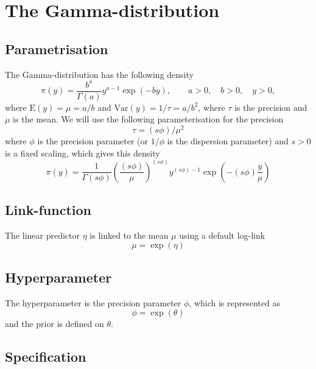\documentclass[a4paper,11pt]{article}
\begin{document}
\section*{The Gamma-distribution}

\subsection*{Parametrisation}

The Gamma-distribution has the following density
\begin{displaymath}
    \pi(y) = \frac{b^{a}}{\Gamma(a)} y^{a-1} \exp(-by), \qquad a>0,
    \quad b>0, \quad y >0,
\end{displaymath}
where $\text{E}(y) = \mu = a/b$ and $\text{Var}(y) = 1/\tau = a/b^{2}$,
where $\tau$ is the precision and $\mu$ is the mean. We will use the
following parameterisation for the precision
\begin{displaymath}
    \tau = (s\phi) / \mu^{2}
\end{displaymath}
where $\phi$ is the precision parameter (or $1/\phi$ is the dispersion
parameter) and $s>0$ is a fixed scaling, which gives this density
\begin{displaymath}
    \pi(y) = \frac{1}{\Gamma(s\phi)}
    \left(\frac{(s\phi)}{\mu}\right)^{(s\phi)}
    y^{(s\phi) -1} \exp\left(-(s\phi) \frac{y}{\mu}\right)
\end{displaymath}


\subsection*{Link-function}

The linear predictor $\eta$ is linked to the mean $\mu$ using a
default log-link
\begin{displaymath}
    \mu = \exp(\eta)
\end{displaymath}

\subsection*{Hyperparameter}

The hyperparameter is the precision parameter $\phi$, which is
represented as
\begin{displaymath}
    \phi = \exp(\theta)
\end{displaymath}
and the prior is defined on $\theta$.

\subsection*{Specification}
\end{document}
